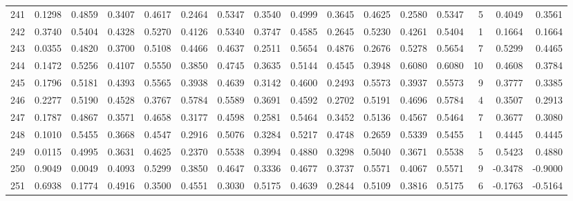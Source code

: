 \begin{tabular}{lrrrrrrrrrrrrrrr}
241 &      0.1298 &  0.4859 &  0.3407 &  0.4617 &  0.2464 &  0.5347 &  0.3540 &  0.4999 &  0.3645 &  0.4625 &   0.2580 &     0.5347 &      5 &                    0.4049 &                     0.3561 \\
242 &      0.3740 &  0.5404 &  0.4328 &  0.5270 &  0.4126 &  0.5340 &  0.3747 &  0.4585 &  0.2645 &  0.5230 &   0.4261 &     0.5404 &      1 &                    0.1664 &                     0.1664 \\
243 &      0.0355 &  0.4820 &  0.3700 &  0.5108 &  0.4466 &  0.4637 &  0.2511 &  0.5654 &  0.4876 &  0.2676 &   0.5278 &     0.5654 &      7 &                    0.5299 &                     0.4465 \\
244 &      0.1472 &  0.5256 &  0.4107 &  0.5550 &  0.3850 &  0.4745 &  0.3635 &  0.5144 &  0.4545 &  0.3948 &   0.6080 &     0.6080 &     10 &                    0.4608 &                     0.3784 \\
245 &      0.1796 &  0.5181 &  0.4393 &  0.5565 &  0.3938 &  0.4639 &  0.3142 &  0.4600 &  0.2493 &  0.5573 &   0.3937 &     0.5573 &      9 &                    0.3777 &                     0.3385 \\
246 &      0.2277 &  0.5190 &  0.4528 &  0.3767 &  0.5784 &  0.5589 &  0.3691 &  0.4592 &  0.2702 &  0.5191 &   0.4696 &     0.5784 &      4 &                    0.3507 &                     0.2913 \\
247 &      0.1787 &  0.4867 &  0.3571 &  0.4658 &  0.3177 &  0.4598 &  0.2581 &  0.5464 &  0.3452 &  0.5136 &   0.4567 &     0.5464 &      7 &                    0.3677 &                     0.3080 \\
248 &      0.1010 &  0.5455 &  0.3668 &  0.4547 &  0.2916 &  0.5076 &  0.3284 &  0.5217 &  0.4748 &  0.2659 &   0.5339 &     0.5455 &      1 &                    0.4445 &                     0.4445 \\
249 &      0.0115 &  0.4995 &  0.3631 &  0.4625 &  0.2370 &  0.5538 &  0.3994 &  0.4880 &  0.3298 &  0.5040 &   0.3671 &     0.5538 &      5 &                    0.5423 &                     0.4880 \\
250 &      0.9049 &  0.0049 &  0.4093 &  0.5299 &  0.3850 &  0.4647 &  0.3336 &  0.4677 &  0.3737 &  0.5571 &   0.4067 &     0.5571 &      9 &                   -0.3478 &                    -0.9000 \\
251 &      0.6938 &  0.1774 &  0.4916 &  0.3500 &  0.4551 &  0.3030 &  0.5175 &  0.4639 &  0.2844 &  0.5109 &   0.3816 &     0.5175 &      6 &                   -0.1763 &                    -0.5164 \\

\end{tabular}
